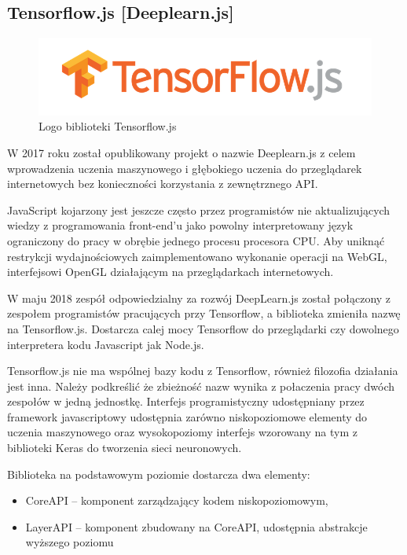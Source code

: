 \documentclass[12pt,a4paper,twoside,titlepage,openright]{book}
\begin{document}
\subsection{Tensorflow.js [Deeplearn.js]}
\begin{figure}[ht]
	\centering
			\includegraphics[resolution=100, scale=0.6]{TensorflowJS.png}
		\caption{Logo biblioteki Tensorflow.js}
\end{figure}

W 2017 roku został opublikowany projekt o nazwie Deeplearn.js z celem wprowadzenia uczenia maszynowego i głębokiego uczenia do przeglądarek internetowych bez konieczności korzystania z zewnętrznego API.

JavaScript kojarzony jest jeszcze często przez programistów nie aktualizujących wiedzy z programowania front-end'u jako powolny interpretowany język ograniczony do pracy w obrębie jednego procesu procesora CPU.\cite{siteSlowJavaScript} Aby uniknąć restrykcji wydajnościowych zaimplementowano wykonanie operacji na WebGL, interfejsowi OpenGL działającym na przeglądarkach internetowych.

W maju 2018 zespół odpowiedzialny za rozwój DeepLearn.js został połączony z zespołem programistów pracujących przy Tensorflow, a biblioteka zmieniła nazwę na Tensorflow.js. Dostarcza calej mocy Tensorflow do przeglądarki czy dowolnego interpretera kodu Javascript jak Node.js.

Tensorflow.js nie ma wspólnej bazy kodu z Tensorflow, również filozofia działania jest inna. Należy podkreślić że zbieżność nazw wynika z połaczenia pracy dwóch zespołów w jedną jednostkę. Interfejs programistyczny udostępniany przez framework javascriptowy udostępnia zarówno niskopoziomowe elementy do uczenia maszynowego oraz wysokopoziomy interfejs wzorowany na tym z biblioteki Keras do tworzenia sieci neuronowych.

Biblioteka na podstawowym poziomie dostarcza dwa elementy:
\begin{itemize}
\item CoreAPI -- komponent zarządzający kodem niskopoziomowym,
\item LayerAPI -- komponent zbudowany na CoreAPI, udostępnia abstrakcje wyższego poziomu
\end{itemize}
\end{document}
